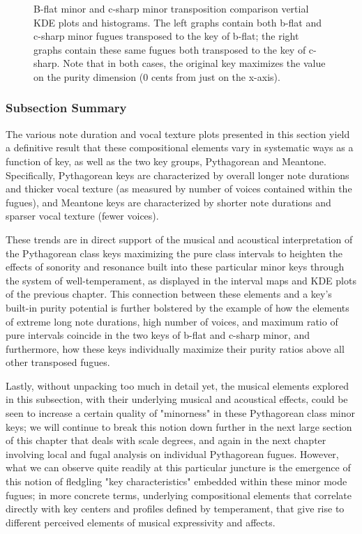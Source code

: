 \begin{figure}[H]
\vspace{1.5em}
    \centering
    \caption[B-flat minor and c-sharp minor transposition comparison vertial KDE plots and histograms. ]{B-flat minor and c-sharp minor transposition comparison vertial KDE plots and histograms. The left graphs contain both b-flat and c-sharp minor fugues transposed to the key of b-flat; the right graphs contain these same fugues both transposed to the key of c-sharp. Note that in both cases, the original key maximizes the value on the purity dimension (0 cents from just on the x-axis).}
\end{figure}    \subsubsection{Subsection Summary}\label{subsection-summary}

The various note duration and vocal texture plots presented in this
section yield a definitive result that these compositional elements vary
in systematic ways as a function of key, as well as the two key groups,
Pythagorean and Meantone. Specifically, Pythagorean keys are
characterized by overall longer note durations and thicker vocal texture
(as measured by number of voices contained within the fugues), and
Meantone keys are characterized by shorter note durations and sparser
vocal texture (fewer voices).

These trends are in direct support of the musical and acoustical
interpretation of the Pythagorean class keys maximizing the pure class
intervals to heighten the effects of sonority and resonance built into
these particular minor keys through the system of well-temperament, as
displayed in the interval maps and KDE plots of the previous chapter.
This connection between these elements and a key's built-in purity
potential is further bolstered by the example of how the elements of
extreme long note durations, high number of voices, and maximum ratio of
pure intervals coincide in the two keys of b-flat and c-sharp minor, and
furthermore, how these keys individually maximize their purity ratios
above all other transposed fugues.

Lastly, without unpacking too much in detail yet, the musical elements
explored in this subsection, with their underlying musical and
acoustical effects, could be seen to increase a certain quality of
"minorness" in these Pythagorean class minor keys; we will continue to
break this notion down further in the next large section of this chapter
that deals with scale degrees, and again in the next chapter involving
local and fugal analysis on individual Pythagorean fugues. However, what
we can observe quite readily at this particular juncture is the
emergence of this notion of fledgling "key characteristics" embedded
within these minor mode fugues; in more concrete terms, underlying
compositional elements that correlate directly with key centers and
profiles defined by temperament, that give rise to different perceived
elements of musical expressivity and affects.

